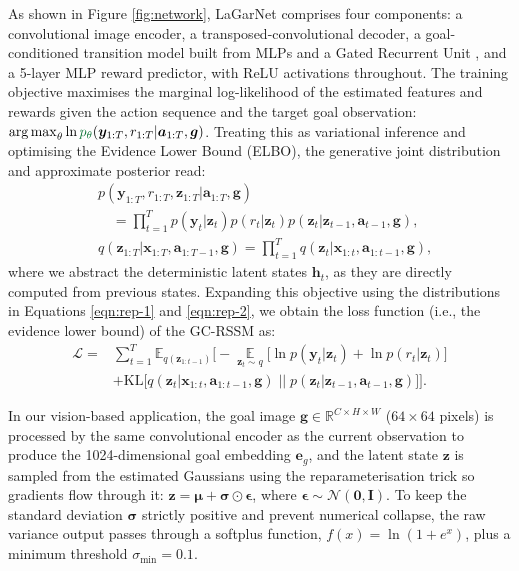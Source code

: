 \documentclass[journal]{IEEEtran}
\DeclareMathOperator{\E}{\mathbb{E}}
\DeclareMathOperator*{\argmax}{arg\,max}
\newif\ifshowrev\showrevtrue
\newcommand{\rev}[1]{\ifshowrev\textcolor{revblue}{#1}\else#1\fi}
\newif\ifshowirev\showirevtrue
\newcommand{\irev}[1]{\ifshowirev\textcolor{irevgreen}{#1}\else#1\fi}
\begin{document}
\rev{As shown in Figure \ref{fig:network}, LaGarNet comprises four components: a convolutional image encoder, a transposed-convolutional decoder, a goal-conditioned transition model built from MLPs and a Gated Recurrent Unit \cite{cho2014properties}, and a 5-layer MLP reward predictor, with ReLU activations throughout. The training objective maximises the marginal log-likelihood of the estimated features and rewards given the action sequence and the target goal observation: $\argmax_{\theta} \ln \irev{p_{\theta}}(\bm{y}_{1:T}, r_{1:T} | \bm{a}_{1:T}, \bm{g})$.} \rev{Treating this as variational inference and optimising the Evidence Lower Bound (ELBO), the generative joint distribution and approximate posterior read:}
\begin{align}
    &p(\bm{y}_{1:T}, r_{1:T}, \bm{z}_{1:T} | \bm{a}_{1:T}, \bm{g}) \nonumber \\
    &\quad = \prod_{t=1}^T p(\bm{y}_t|\bm{z}_t) p(r_t|\bm{z}_t) p(\bm{z}_t|\bm{z}_{t-1}, \bm{a}_{t-1}, \bm{g}), \label{eqn:rep-1}\\
    &q(\bm{z}_{1:T}| \bm{x}_{1:T}, \bm{a}_{1:T-1}, \bm{g}) = \prod_{t=1}^T q(\bm{z}_t| \bm{x}_{1:t}, \bm{a}_{1:t-1}, \bm{g}) \label{eqn:rep-2},
\end{align}
where we abstract the deterministic latent states $\bm{h}_t$, as they are directly computed from previous states. Expanding this objective using the distributions in Equations \ref{eqn:rep-1} and \ref{eqn:rep-2}, we obtain the loss function (i.e., the evidence lower bound) of the GC-RSSM as:
\begin{align}
    \mathcal{L} =& \sum_{t=1}^{T} \mathbb{E}_{q(\bm{z}_{1:t-1})} \Bigg[ - 
     \underset{\bm{z}_t \sim q}{\E} \Big[ \ln p(\bm{y}_t|\bm{z}_t) + \ln p(r_t|\bm{z}_t) \Big] \nonumber\\
    &+ \text{KL}\Big[ q(\bm{z}_t|\bm{x}_{1:t}, \bm{a}_{1:{t-1}}, \bm{g}) \;\Big|\Big|\; p(\bm{z}_{t}|\bm{z}_{t-1}, \bm{a}_{t-1}, \bm{g}) \Big]
     \Bigg] \label{eqn:planet-objective-1}.
\end{align}

\rev{In our vision-based application, the goal image $\bm{g} \in \mathbb{R}^{C\times H\times W}$ ($64\times64$ pixels) is processed by the same convolutional encoder as the current observation to produce the 1024-dimensional goal embedding $\bm{e}_g$, and the latent state $\bm{z}$ is sampled from the estimated Gaussians using the reparameterisation trick \cite{kingma2013auto} so gradients flow through it: $\bm{z} = \bm{\mu} + \bm{\sigma} \odot \bm{\epsilon}$, where $\bm{\epsilon} \sim \mathcal{N}(\bm{0}, \bm{I})$.}
\rev{To keep the standard deviation $\bm{\sigma}$ strictly positive and prevent numerical collapse, the raw variance output passes through a softplus function, $f(x)=\ln(1+e^x)$, plus a minimum threshold $\sigma_{\text{min}} = 0.1$.}
\end{document}
